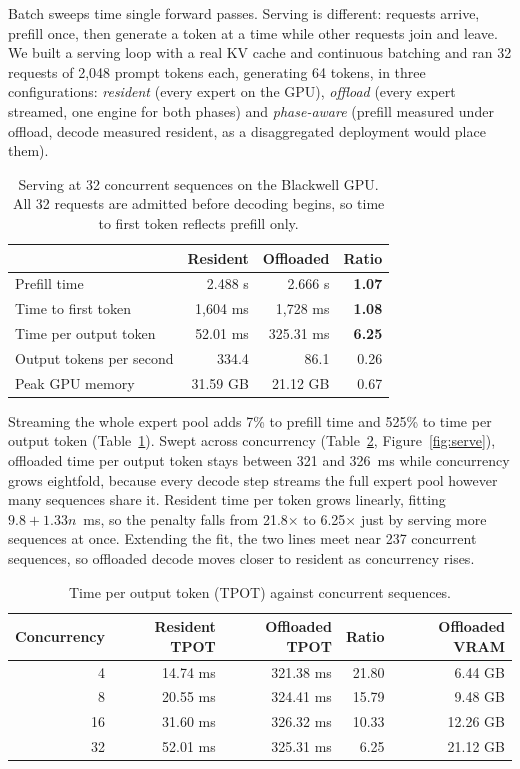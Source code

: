 \documentclass[10pt,a4paper]{article}
\begin{document}
Batch sweeps time single forward passes. Serving is different: requests arrive,
prefill once, then generate a token at a time while other requests join and leave.
We built a serving loop with a real KV cache and continuous batching and ran
32 requests of 2{,}048 prompt tokens each, generating 64 tokens, in three
configurations: \emph{resident} (every expert on the GPU), \emph{offload} (every
expert streamed, one engine for both phases) and \emph{phase-aware} (prefill
measured under offload, decode measured resident, as a disaggregated deployment
would place them).

\begin{table}[htbp]
\centering\small
\caption{Serving at 32 concurrent sequences on the Blackwell GPU. All 32 requests
are admitted before decoding begins, so time to first token reflects prefill only.}
\label{tab:serve}
\begin{tabular}{lrrr}
\toprule
 & Resident & Offloaded & Ratio \\
\midrule
Prefill time             & 2.488 s    & 2.666 s    & \textbf{1.07} \\
Time to first token      & 1{,}604 ms & 1{,}728 ms & \textbf{1.08} \\
Time per output token    & 52.01 ms   & 325.31 ms  & \textbf{6.25} \\
Output tokens per second & 334.4      & 86.1       & 0.26 \\
Peak GPU memory          & 31.59 GB   & 21.12 GB   & 0.67 \\
\bottomrule
\end{tabular}
\end{table}

Streaming the whole expert pool adds 7\% to prefill time and 525\% to time per
output token (Table~\ref{tab:serve}). Swept across concurrency
(Table~\ref{tab:servesweep}, Figure~\ref{fig:serve}), offloaded time per output
token stays between 321 and 326~ms while concurrency grows eightfold, because
every decode step streams the full expert pool however many sequences share it.
Resident time per token grows linearly, fitting $9.8 + 1.33n$~ms, so the penalty
falls from 21.8$\times$ to 6.25$\times$ just by serving more sequences at once.
Extending the fit, the two lines meet near 237 concurrent sequences, so
offloaded decode moves closer to resident as concurrency rises.

\begin{table}[htbp]
\centering\small
\caption{Time per output token (TPOT) against concurrent sequences.}
\label{tab:servesweep}
\begin{tabular}{rrrrr}
\toprule
Concurrency & Resident TPOT & Offloaded TPOT & Ratio & Offloaded VRAM \\
\midrule
4  & 14.74 ms & 321.38 ms & 21.80 &  6.44 GB \\
8  & 20.55 ms & 324.41 ms & 15.79 &  9.48 GB \\
16 & 31.60 ms & 326.32 ms & 10.33 & 12.26 GB \\
32 & 52.01 ms & 325.31 ms &  6.25 & 21.12 GB \\
\bottomrule
\end{tabular}
\end{table}
\end{document}
